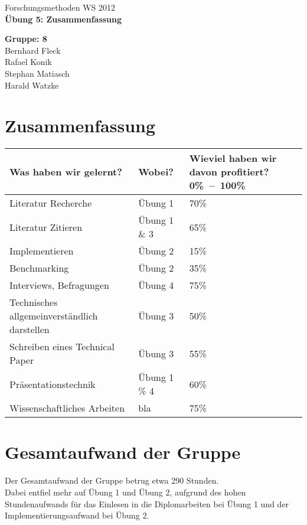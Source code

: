 \documentclass[%
paper=a4,                       %
fontsize=11pt,                  %
DIV=calc,                       %
parskip=half,                   %
titlepage,                      %
headings=big,               %
bibliography=totoc,             %
]
{scrartcl}
\begin{document}
\begin{titlepage}
\sffamily

{ \Large Forschungsmethoden WS 2012} \\[2cm]
    
{ \Huge \centering \bfseries Übung 5: Zusammenfassung \\[1.5cm] }


%

\vfill

{ \large
   { \bfseries Gruppe: 8 \\ }
   Bernhard Fleck \\
   Rafael Konik \\
   Stephan Matiasch \\
   Harald Watzke \\
}
\end{titlepage}

\section{Zusammenfassung}

\begin{table}[!ht]
   \begin{center}
	\begin{tabular}{p{6cm}lm{3cm}}
    \toprule
	\textbf{Was haben wir gelernt?} & \textbf{Wobei?} & \textbf{Wieviel haben wir davon profitiert? 0\%~--~100\%} \tabularnewline
    \midrule
	 Literatur Recherche & Übung 1 & 70\% \tabularnewline
     \addlinespace
 	 Literatur Zitieren & Übung 1 \& 3 & 65\% \tabularnewline
     \addlinespace
	 Implementieren & Übung 2 & 15\% \tabularnewline
     \addlinespace
	 Benchmarking & Übung 2 & 35\% \tabularnewline
     \addlinespace
	 Interviews, Befragungen & Übung 4 & 75\% \tabularnewline
     \addlinespace
	 Technisches all\-ge\-mein\-ver\-ständ\-lich darstellen & Übung 3 & 50\% \tabularnewline
     \addlinespace
	 Schreiben eines Technical Paper & Übung 3 & 55\% \tabularnewline
     \addlinespace
	 Präsentationstechnik & Übung 1 \% 4 & 60\% \tabularnewline
     \addlinespace
	 Wissenschaftliches Arbeiten & bla & 75\% \tabularnewline

     \bottomrule
	\end{tabular}
   \end{center}
\end{table}

\section{Gesamtaufwand der Gruppe}

Der Gesamtaufwand der Gruppe betrug etwa 290 Stunden.\\ Dabei entfiel mehr auf Übung 1 und Übung 2, aufgrund des hohen Stundenaufwands für das Einlesen in die Diplomarbeiten bei Übung 1 und der Implementierungsaufwand bei Übung 2.
\end{document}
